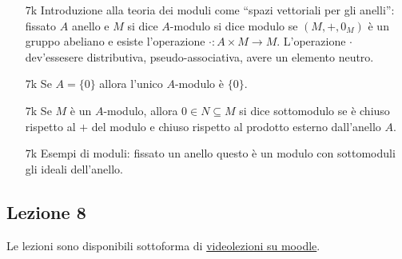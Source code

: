 \documentclass[italian]{article}
\begin{document}
    \begin{enumerate}
      \item[7k] Introduzione alla teoria dei moduli come ``spazi vettoriali per
        gli anelli'': fissato $A$ anello e $M$ si dice $A$-modulo si dice modulo 
        se $(M,+,0_M)$ è un gruppo abeliano e esiste l'operazione $\cdot \colon 
        A \times M \to M$. L'operazione $\cdot$ dev'essesere distributiva,
        pseudo-associativa, avere un elemento neutro.
      \item[7k] Se $A = \{0\}$ allora l'unico $A$-modulo è $\{0\}$. 
      \item[7k] Se $M$ è un $A$-modulo, allora $0 \in N \subseteq M$ si dice
        sottomodulo se è chiuso rispetto al $+$ del modulo e chiuso rispetto al
        prodotto esterno dall'anello $A$.
      \item[7k] Esempi di moduli: fissato un anello questo è un modulo con
        sottomoduli gli ideali dell'anello.
    \end{enumerate}


    \subsection{Lezione 8}

    Le lezioni sono disponibili sottoforma di 
    \href{https://didatticaonline.unitn.it/dol/course/view.php?id=23268}{videolezioni
    su moodle}.
    
\end{document}
